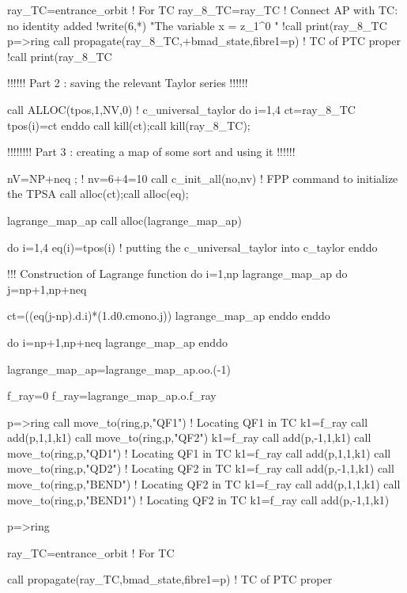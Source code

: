 \documentclass{hitec}     %
\begin{document}
{{{{{{\begin{code}
   ray_TC=entrance_orbit   !  For TC
   ray_8_TC=ray_TC  ! Connect AP with TC: no identity added
   !write(6,*) "The variable x = z_1^0 "
   !call print(ray_8_TC%
   p=>ring%
   call propagate(ray_8_TC,+bmad_state,fibre1=p) !  TC of PTC proper
   !call print(ray_8_TC%
   
   !!!!!! Part 2 : saving the relevant Taylor series  !!!!!!

   call ALLOC(tpos,1,NV,0) ! c_universal_taylor
   do i=1,4
    ct=ray_8_TC%
    tpos(i)=ct
   enddo
   call kill(ct);call kill(ray_8_TC);

!!!!!!!! Part 3 : creating a map of some sort and using it !!!!!!


   nV=NP+neq ;  ! nv=6+4=10
   call c_init_all(no,nv)   ! FPP command to initialize the TPSA
   call alloc(ct);call alloc(eq);

   lagrange_map_ap%
   call alloc(lagrange_map_ap)
   
   do i=1,4
    eq(i)=tpos(i)   ! putting the c_universal_taylor into c_taylor
   enddo
   
   !!!  Construction of Lagrange function
   do i=1,np
    lagrange_map_ap%
    do j=np+1,np+neq

     ct=((eq(j-np).d.i)*(1.d0.cmono.j))
     lagrange_map_ap%
    enddo         
   enddo 

   do i=np+1,np+neq
    lagrange_map_ap%
   enddo 
   
   lagrange_map_ap=lagrange_map_ap.oo.(-1)

   f_ray=0
   f_ray=lagrange_map_ap.o.f_ray
   
   p=>ring%
   call move_to(ring,p,"QF1")   !  Locating QF1 in TC
    k1=f_ray%
    call add(p,1,1,k1)
   call move_to(ring,p,"QF2") 
    k1=f_ray%
    call add(p,-1,1,k1)
   call move_to(ring,p,"QD1")   !  Locating QF1 in TC
    k1=f_ray%
    call add(p,1,1,k1)
   call move_to(ring,p,"QD2")   !  Locating QF2 in TC
    k1=f_ray%
    call add(p,-1,1,k1)
   call move_to(ring,p,"BEND")   !  Locating QF2 in TC
    k1=f_ray%
    call add(p,1,1,k1)
   call move_to(ring,p,"BEND1")   !  Locating QF2 in TC
    k1=f_ray%
    call add(p,-1,1,k1)

   p=>ring%

   ray_TC=entrance_orbit   !  For TC
    
   call propagate(ray_TC,bmad_state,fibre1=p) !  TC of PTC proper


\end{code}}}}}}}
\end{document}

